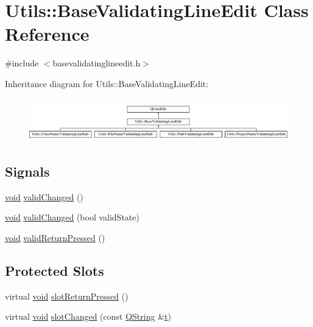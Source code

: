 \hypertarget{class_utils_1_1_base_validating_line_edit}{\section{Utils\-:\-:Base\-Validating\-Line\-Edit Class Reference}
\label{class_utils_1_1_base_validating_line_edit}
}


{\ttfamily \#include $<$basevalidatinglineedit.\-h$>$}

Inheritance diagram for Utils\-:\-:Base\-Validating\-Line\-Edit\-:\begin{figure}[H]
\begin{center}
\leavevmode
\includegraphics[height=1.891892cm]{class_utils_1_1_base_validating_line_edit}
\end{center}
\end{figure}
\subsection*{Signals}
\begin{DoxyCompactItemize}
\item 
\hyperlink{group___u_a_v_objects_plugin_ga444cf2ff3f0ecbe028adce838d373f5c}{void} \hyperlink{class_utils_1_1_base_validating_line_edit_a870ff192086bf4c4a0a9a0b08d627c08}{valid\-Changed} ()
\item 
\hyperlink{group___u_a_v_objects_plugin_ga444cf2ff3f0ecbe028adce838d373f5c}{void} \hyperlink{class_utils_1_1_base_validating_line_edit_ac0df0e8ad47ecded73920f823fa1a425}{valid\-Changed} (bool valid\-State)
\item 
\hyperlink{group___u_a_v_objects_plugin_ga444cf2ff3f0ecbe028adce838d373f5c}{void} \hyperlink{class_utils_1_1_base_validating_line_edit_a4eabb0eea13a9067d93e1fffd1e3fc6d}{valid\-Return\-Pressed} ()
\end{DoxyCompactItemize}
\subsection*{Protected Slots}
\begin{DoxyCompactItemize}
\item 
virtual \hyperlink{group___u_a_v_objects_plugin_ga444cf2ff3f0ecbe028adce838d373f5c}{void} \hyperlink{class_utils_1_1_base_validating_line_edit_a7c452527ffd93e1b201f0d3e2340ee36}{slot\-Return\-Pressed} ()
\item 
virtual \hyperlink{group___u_a_v_objects_plugin_ga444cf2ff3f0ecbe028adce838d373f5c}{void} \hyperlink{class_utils_1_1_base_validating_line_edit_ab20d444798b262703c012c68bbfdf44e}{slot\-Changed} (const \hyperlink{group___u_a_v_objects_plugin_gab9d252f49c333c94a72f97ce3105a32d}{Q\-String} \&\hyperlink{glext_8h_a00140d6f5c548b26daf170bf16e86a6d}{t})
\end{DoxyCompactItemize}
